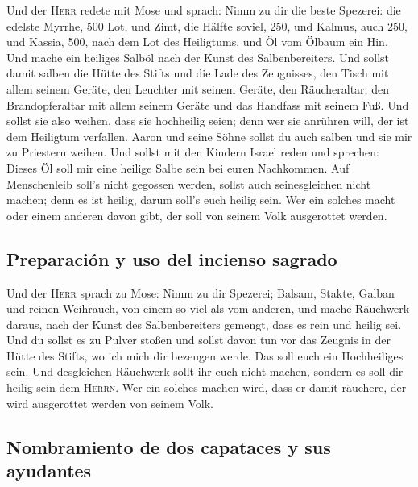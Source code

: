  Und der \textsc{Herr} redete mit Mose und sprach:
 Nimm zu dir die beste Spezerei: die edelste Myrrhe, 500
Lot, und Zimt, die Hälfte soviel, 250, und Kalmus, auch 250,
 und Kassia, 500, nach dem Lot des Heiligtums, und Öl vom
Ölbaum ein Hin.  Und mache ein heiliges Salböl nach der
Kunst des Salbenbereiters.  Und sollst damit salben die
Hütte des Stifts und die Lade des Zeugnisses,  den Tisch
mit allem seinem Geräte, den Leuchter mit seinem Geräte, den
Räucheraltar,  den Brandopferaltar mit allem seinem
Geräte und das Handfass mit seinem Fuß.  Und sollst sie
also weihen, dass sie hochheilig seien; denn wer sie anrühren will, der
ist dem Heiligtum verfallen.  Aaron und seine Söhne
sollst du auch salben und sie mir zu Priestern weihen. 
Und sollst mit den Kindern Israel reden und sprechen: Dieses Öl soll mir
eine heilige Salbe sein bei euren Nachkommen.  Auf
Menschenleib soll's nicht gegossen werden, sollst auch seinesgleichen
nicht machen; denn es ist heilig, darum soll's euch heilig sein.
 Wer ein solches macht oder einem anderen davon gibt, der
soll von seinem Volk ausgerottet werden.

\hypertarget{preparaciuxf3n-y-uso-del-incienso-sagrado}{%
\subsection{Preparación y uso del incienso
sagrado}\label{preparaciuxf3n-y-uso-del-incienso-sagrado}}

 Und der \textsc{Herr} sprach zu Mose: Nimm zu dir
Spezerei; Balsam, Stakte, Galban und reinen Weihrauch, von einem so viel
als vom anderen,  und mache Räuchwerk daraus, nach der
Kunst des Salbenbereiters gemengt, dass es rein und heilig sei.
 Und du sollst es zu Pulver stoßen und sollst davon tun
vor das Zeugnis in der Hütte des Stifts, wo ich mich dir bezeugen werde.
Das soll euch ein Hochheiliges sein.  Und desgleichen
Räuchwerk sollt ihr euch nicht machen, sondern es soll dir heilig sein
dem \textsc{Herrn}.  Wer ein solches machen wird, dass er
damit räuchere, der wird ausgerottet werden von seinem Volk.

\hypertarget{nombramiento-de-dos-capataces-y-sus-ayudantes}{%
\subsection{Nombramiento de dos capataces y sus
ayudantes}\label{nombramiento-de-dos-capataces-y-sus-ayudantes}}


